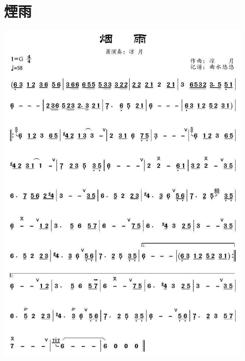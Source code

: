 \documentclass[cn,pad,twocol]{elegantbook}
\begin{document}
\section{煙雨}      \includegraphics[width=0.95\textwidth]{dongxiao/20201231-烟雨}
\end{document}
